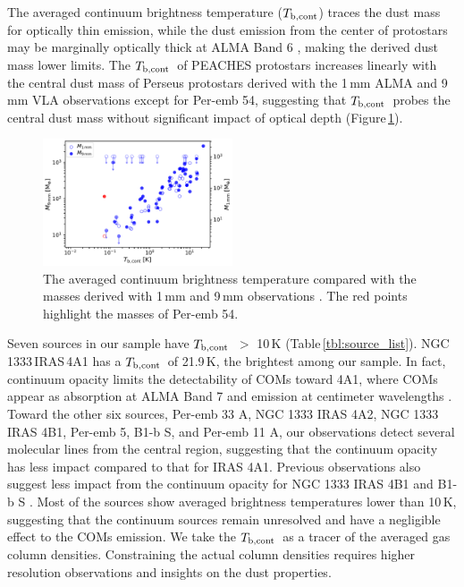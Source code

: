 \documentclass[twocolumn]{aastex62}
\newcommand{\tbc}{\mbox{$T_{\rm b, cont}$}}
\begin{document}
The averaged continuum brightness temperature (\tbc) traces the dust mass for optically thin emission, while the dust emission from the center of protostars may be marginally optically thick at ALMA Band 6 \citep{2020ApJ...889..172K}, making the derived dust mass lower limits.  The \tbc\ of PEACHES protostars increases linearly with the central dust mass of Perseus protostars derived with the 1\,mm ALMA and 9\,mm VLA observations \citep{2020arXiv200602812T} except for Per-emb 54, suggesting that \tbc\ probes the central dust mass without significant impact of optical depth (Figure\,\ref{fig:Tb_M}).

\begin{figure}[htbp!]
  \centering
  \includegraphics[width=0.5\textwidth]{Tb_M.pdf}
  \caption{The averaged continuum brightness temperature compared with the masses derived with 1\,mm and 9\,mm observations \citep{2020arXiv200602812T}.  The red points highlight the masses of Per-emb 54.}
  \label{fig:Tb_M}
\end{figure}

Seven sources in our sample have \tbc\ $>$ 10\,K (Table\,\ref{tbl:source_list}).  NGC 1333\,IRAS\,4A1 has a \tbc\ of 21.9\,K, the brightest among our sample.  In fact, continuum opacity limits the detectability of COMs toward 4A1, where COMs appear as absorption at ALMA Band 7 \citep{2019ApJ...872..196S} and emission at centimeter wavelengths \citep{2020ApJ...896L...3D}.  Toward the other six sources, Per-emb 33 A, NGC 1333 IRAS 4A2, NGC 1333 IRAS 4B1, Per-emb 5, B1-b S, and Per-emb 11 A, our observations detect several molecular lines from the central region, suggesting that the continuum opacity has less impact compared to that for IRAS 4A1.  Previous observations also suggest less impact from the continuum opacity for NGC 1333 IRAS 4B1 \citep{2020AA...635A.198B} and B1-b S \citep{2018AA...620A..80M}.  Most of the sources show averaged brightness temperatures lower than 10\,K, suggesting that the continuum sources remain unresolved and have a negligible effect to the COMs emission.  We take the \tbc\ as a tracer of the averaged gas column densities.  Constraining the actual column densities requires higher resolution observations and insights on the dust properties.
\end{document}
